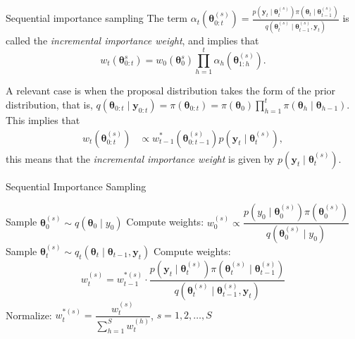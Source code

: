 \documentclass[12pt, compress]{beamer}
\begin{document}
\begin{frame}{Sequential importance sampling}
The term $\alpha_t(\bm{\theta}_{0:t}^{(s)})=\frac{p(\bm{y}_{t}\mid \bm{\theta}_{t}^{(s)})\pi(\bm{\theta}_{t}\mid \bm{\theta}_{t-1}^{(s)})}{q(\bm{\theta}_t^{(s)}\mid \bm{\theta}_{t-1}^{(s)},\bm{y}_{t})}$ is called the \textit{incremental importance weight}, and implies that
	$$w_t(\bm{\theta}^{s}_{0:t})=w_0(\bm{\theta}^{s}_{0})\prod_{h=1}^{t}\alpha_h(\bm{\theta}_{1:h}^{(s)}).$$ 

A relevant case is when the proposal distribution takes the form of the prior distribution, that is, $q(\bm{\theta}_{0:t}\mid \bm{y}_{0:t}) = \pi(\bm{\theta}_{0:t}) = \pi(\bm{\theta}_0)\prod_{h=1}^{t}\pi(\bm{\theta}_h\mid \bm{\theta}_{h-1})$. This implies that
\begin{align*}
	w_{t}(\bm{\theta}^{(s)}_{0:t})&\propto w_{t-1}^*(\bm{\theta}^{(s)}_{0:t-1})p(\bm{y}_{t}\mid \bm{\theta}_{t}^{(s)}),
\end{align*}
this means that the \textit{incremental importance weight} is given by $p(\bm{y}_{t}\mid \bm{\theta}_{t}^{(s)})$. 
\end{frame}

\begin{frame}{Sequential Importance Sampling}
	\begin{algorithm}[H]
		\caption{Sequential Importance Sampling Algorithm}
		\label{Alg:SIS}
		{\scriptsize{
		\begin{algorithmic}[1]
			\State Sample $\bm{\theta}_0^{(s)} \sim q(\bm{\theta}_0 \mid y_0)$
			\State Compute weights: $w_0^{(s)} \propto \dfrac{p(y_0 \mid \bm{\theta}_0^{(s)}) \pi(\bm{\theta}_0^{(s)})}{q(\bm{\theta}_0^{(s)} \mid y_0)}$
			\EndFor
			\State Sample $\bm{\theta}_t^{(s)} \sim q_t(\bm{\theta}_t \mid \bm{\theta}_{t-1}, \bm{y}_t)$
			\State Compute weights:
			\[
			w_t^{(s)} = w_{t-1}^{*(s)} \cdot \frac{p(\bm{y}_t \mid \bm{\theta}_t^{(s)}) \pi(\bm{\theta}_t^{(s)} \mid \bm{\theta}_{t-1}^{(s)})}{q(\bm{\theta}_t^{(s)} \mid \bm{\theta}_{t-1}^{(s)}, \bm{y}_t)}
			\]
			\EndFor
			\State Normalize: $w_t^{*(s)} = \dfrac{w_t^{(s)}}{\sum_{h=1}^{S} w_t^{(h)}}$, \quad $s = 1, 2, \dots, S$
			\EndFor
		\end{algorithmic}
	}}
	\end{algorithm}
\end{frame}
\end{document}

